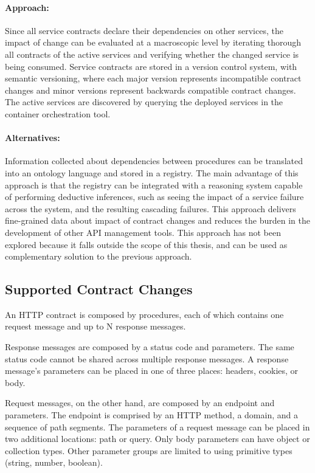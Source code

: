 \paragraph{Approach:}
Since all service contracts declare their dependencies on other services, the impact of change can be evaluated at a macroscopic level by
iterating thorough all contracts of the active services and verifying whether the changed service is being consumed.
Service contracts are stored in a version control system, with semantic versioning, where
each major version represents incompatible contract changes and minor versions represent backwards compatible contract changes.
The active services are discovered by querying the deployed services in the container orchestration tool.

\paragraph{Alternatives:}
Information collected about dependencies between procedures can be translated into an ontology language \cite{ontology} and stored in a registry.
The main advantage of this approach is that the registry can be integrated with a reasoning system capable of performing deductive inferences, such as
seeing the impact of a service failure across the system, and the resulting cascading failures.
This approach delivers fine-grained data about impact of contract changes and reduces the burden in the development of other API management tools.
This approach has not been explored because it falls outside the scope of this thesis, and can be used as complementary solution to the previous approach.

\subsection{Supported Contract Changes} %
\label{sec:supported_contract_changes}

An HTTP contract is composed by procedures, each of which contains one request message and up to N response messages.

Response messages are composed by a status code and parameters.
The same status code cannot be shared across multiple response messages.
A response message's parameters can be placed in one of three places: headers, cookies, or body.

Request messages, on the other hand, are composed by an endpoint and parameters.
The endpoint is comprised by an HTTP method, a domain, and a sequence of path segments.
The parameters of a request message can be placed in two additional locations: path or query.
Only body parameters can have object or collection types.
Other parameter groups are limited to using primitive types (string, number, boolean).

